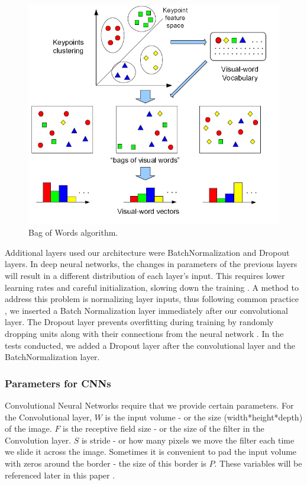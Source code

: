 \documentclass{article}
\begin{document}
\begin{figure}[ht]
  \vskip 0.2in
  \begin{center}
  \centerline{\includegraphics[width=\columnwidth]{bagofwords}}
  \caption {Bag of Words algorithm.}
  \label{bag}
  \end{center}
  \vskip -0.2in
\end{figure}

Additional layers used our architecture were BatchNormalization and Dropout layers. In deep neural networks, the changes in parameters of the previous layers will result in a different distribution of each layer’s input. This requires lower learning rates and careful initialization, slowing down the training \cite{ioffe}. A method to address this problem is normalizing layer inputs, thus following common practice \cite{cs231n}, we inserted a Batch Normalization layer immediately after our convolutional layer. The Dropout layer prevents overfitting during training by randomly dropping units along with their connections from the neural network \cite{drop}. In the tests conducted, we added a Dropout layer after the convolutional layer and the BatchNormalization layer. 





\subsubsection{Parameters for CNNs}
Convolutional Neural Networks require that we provide certain parameters. For the Convolutional layer, $W$ is the input volume - or the size (width*height*depth) of the image. $F$ is the receptive field size - or the size of the filter in the Convolution layer. $S$ is stride - or how many pixels we move the filter each time we slide it across the image. Sometimes it is convenient to pad the input volume with zeros around the border - the size of this border is $P$. These variables will be referenced later in this paper \cite{cs231n}.
\end{document}
